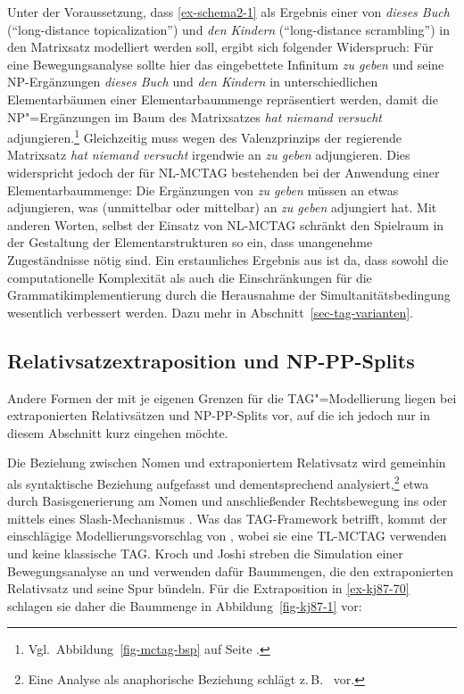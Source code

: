 Unter der Voraussetzung, dass \ref{ex-schema2-1} als Ergebnis einer  von {\it dieses Buch} ("`long-distance topicalization"') und {\it den Kindern} ("`long-distance scrambling"') in den Matrixsatz modelliert werden soll, ergibt sich folgender Widerspruch:
Für eine Bewegungsanalyse sollte hier das eingebettete Infinitum {\it zu geben} und seine NP-Ergänzungen {\it dieses Buch} und {\it den Kindern} in unterschiedlichen Elementarbäumen einer Elementarbaummenge repräsentiert werden, damit die NP"=Ergänzungen im Baum des Matrixsatzes {\it hat niemand versucht} adjungieren.\footnote{Vgl.\ Abbildung~\ref{fig-mctag-bsp} auf Seite \pageref{fig-mctag-bsp}.} Gleichzeitig muss wegen des Valenzprinzips der regierende Matrixsatz {\it hat niemand versucht} irgendwie an {\it zu geben} adjungieren. Dies widerspricht jedoch der für NL-MCTAG bestehenden  bei der Anwendung einer Elementarbaummenge: Die Ergänzungen von {\it zu geben} müssen an etwas adjungieren, was (unmittelbar oder mittelbar) an {\it zu geben} adjungiert hat. Mit anderen Worten, selbst der Einsatz von NL-MCTAG schränkt den Spielraum in der Gestaltung der Elementarstrukturen so ein, dass unangenehme Zugeständnisse nötig sind. Ein erstaunliches Ergebnis aus \cite{Rambow:94} ist da, dass sowohl die computationelle Komplexität als auch die Einschränkungen für die Grammatikimplementierung durch die Herausnahme der Simultanitätsbedingung wesentlich verbessert werden. Dazu mehr in Abschnitt~\ref{sec-tag-varianten}.


\subsection{Relativsatzextraposition und NP-PP-Splits} \label{sec-tag-grenzen-wellnest}

Andere Formen der  mit je eigenen Grenzen für die TAG"=Modellierung liegen bei extraponierten Relativsätzen und NP-PP-Splits vor, auf die ich jedoch nur in diesem Abschnitt kurz eingehen möchte. %

Die Beziehung zwischen Nomen und extraponiertem Relativsatz wird gemeinhin als syntaktische Beziehung aufgefasst und dementsprechend analysiert,\footnote{Eine Analyse als anaphorische Beziehung schlägt z.\,B.\ \cite{Kiss:05} vor.} etwa durch Basisgenerierung am Nomen und anschlie\ss ender Rechtsbewegung ins  \citep{Buering:Hartmann:97} oder mittels eines Slash-Mechanismus \citep{Pollard:Sag:94, Keller:95, Mueller:99}. Was das TAG-Framework betrifft, kommt der einschlägige Modellierungsvorschlag von \cite{Kroch:Joshi:87}, wobei sie eine TL-MCTAG verwenden und keine klassische TAG. Kroch und Joshi streben die Simulation einer Bewegungsanalyse an und verwenden dafür Baummengen, die den extraponierten Relativsatz und seine Spur bündeln. Für die Extraposition in \ref{ex-kj87-70} schlagen sie daher die Baummenge in Abbildung~\ref{fig-kj87-1} vor: 

